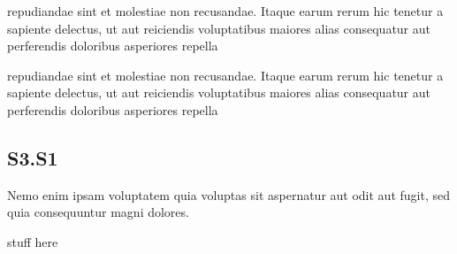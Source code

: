 \documentclass{article}
\begin{document}
repudiandae sint et molestiae non recusandae. Itaque earum rerum hic tenetur a sapiente delectus, ut aut reiciendis voluptatibus maiores alias consequatur aut perferendis doloribus asperiores repella

repudiandae sint et molestiae non recusandae. Itaque earum rerum hic tenetur a sapiente delectus, ut aut reiciendis voluptatibus maiores alias consequatur aut perferendis doloribus asperiores repella

\subsection{S3.S1 }
Nemo enim ipsam voluptatem quia voluptas sit aspernatur aut odit aut fugit, sed quia consequuntur magni dolores.


\begin{appendices}
    stuff here
\end{appendices}
\end{document}
